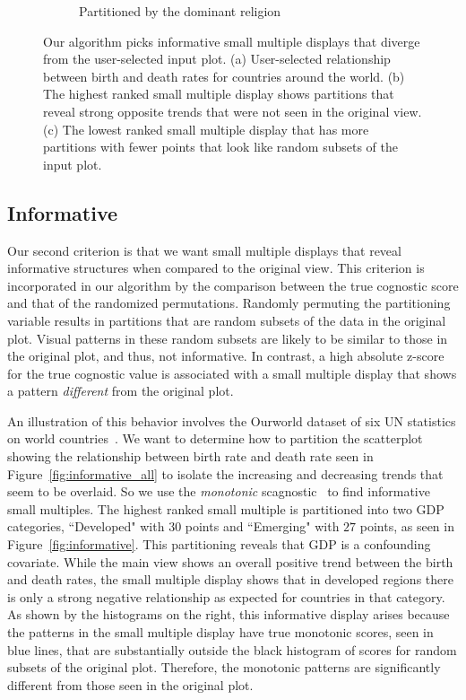 \begin{figure}[t]
\begin{subfigure}{3in}
        \vspace{-0.5cm}
		  \caption{Partitioned by the dominant religion}
		 \label{fig:not_informative}
	 \end{subfigure}
	  \caption{Our algorithm picks informative small multiple displays that diverge from the user-selected input plot. (a) User-selected relationship between birth and death rates for countries around the world. (b) The highest ranked small multiple display shows partitions that reveal strong opposite trends that were not seen in the original view. (c) The lowest ranked small multiple display that has more partitions with fewer points that look like random subsets of the input plot.}
\end{figure}

\subsection{Informative}
Our second criterion is that we want small multiple displays that reveal informative structures when compared to the original view. This criterion is incorporated in our algorithm by the comparison between the true cognostic score and that of the randomized permutations. Randomly permuting the partitioning variable results in partitions that are random subsets of the data in the original plot. Visual patterns in these random subsets are likely to be similar to those in the original plot, and thus, not informative. In contrast, a high absolute z-score for the true cognostic value is associated with a small multiple display that shows a pattern \emph{different} from the original plot.

An illustration of this behavior involves the Ourworld dataset of six UN statistics on world countries~\cite{Wilkinson2005GG}. We want to determine how to partition the scatterplot showing the relationship between birth rate and death rate seen in Figure~\ref{fig:informative_all} to isolate the increasing and decreasing trends that seem to be overlaid. So we use the \emph{monotonic} scagnostic~\cite{Wilkinson2005} to find informative small multiples. The highest ranked small multiple is partitioned into two GDP categories, ``Developed" with $30$ points and ``Emerging" with $27$ points, as seen in Figure~\ref{fig:informative}. This partitioning reveals that GDP is a confounding covariate. While the main view shows an overall positive trend between the birth and death rates, the small multiple display shows that in developed regions there is only a strong negative relationship as expected for countries in that category. As shown by the histograms on the right, this informative display arises because the patterns in the small multiple display have true monotonic scores, seen in blue lines, that are substantially outside the black histogram of scores for random subsets of the original plot. Therefore, the monotonic patterns are significantly different from those seen in the original plot.

